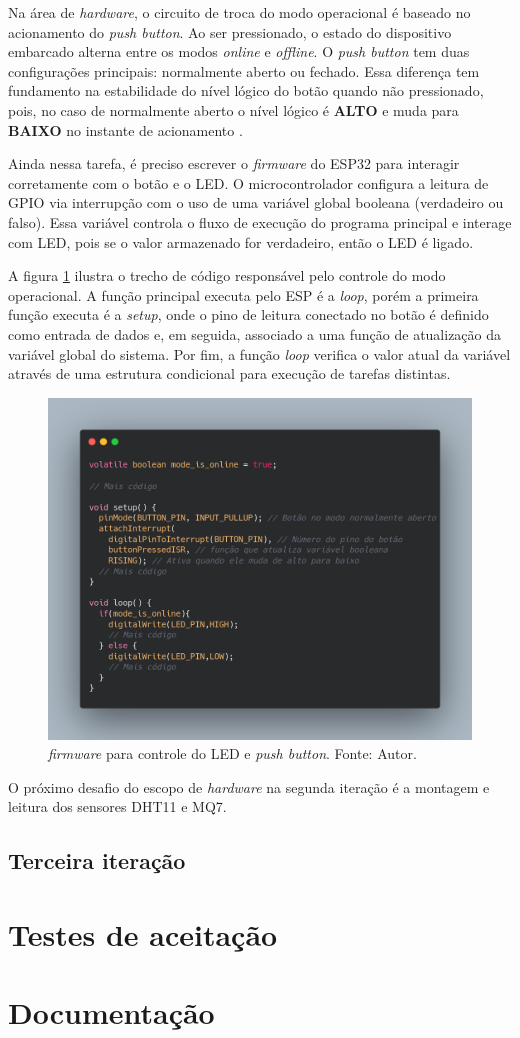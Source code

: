 Na área de \textit{hardware}, o circuito de troca do modo operacional é baseado no acionamento do \textit{push button}. Ao ser 
pressionado, o estado do dispositivo embarcado alterna entre os modos \textit{online} e \textit{offline}. O \textit{push button} 
tem duas configurações principais: normalmente aberto ou fechado. Essa diferença tem fundamento na estabilidade do nível lógico do botão 
quando não pressionado, pois, no caso de normalmente aberto o nível lógico é \textbf{ALTO} e muda para \textbf{BAIXO} no instante de acionamento \cite{arduino-docs}.

Ainda nessa tarefa, é preciso escrever o \textit{firmware} do ESP32 para interagir corretamente com o botão e o LED. O microcontrolador configura a 
leitura de GPIO via interrupção com o uso de uma variável global booleana (verdadeiro ou falso). Essa variável controla o fluxo de execução do programa principal 
e interage com LED, pois se o valor armazenado for verdadeiro, então o LED é ligado.

A figura \ref{figPushButtonFirmware} ilustra o trecho de código responsável pelo controle do modo operacional. A função principal 
executa pelo ESP é a \textit{loop}, porém a primeira função executa é a \textit{setup}, onde o pino de leitura conectado 
no botão é definido como entrada de dados e, em seguida, associado a uma função de atualização da variável global do sistema. Por fim, a função \textit{loop} 
verifica o valor atual da variável através de uma estrutura condicional para execução de tarefas distintas. 

\begin{figure}[ht]
    \centering
    \includegraphics[width=.58\textwidth]{img/push-button-firrmware.png}
    \caption{\textit{firmware} para controle do LED e \textit{push button}. Fonte: Autor.}\label{figPushButtonFirmware}
\end{figure}

O próximo desafio do escopo de \textit{hardware} na segunda iteração é a montagem e leitura dos sensores DHT11 e MQ7.

\subsection{Terceira iteração}\label{ExecAtv3It}

\section{Testes de aceitação}\label{fase5}

\section{Documentação}\label{fase6}